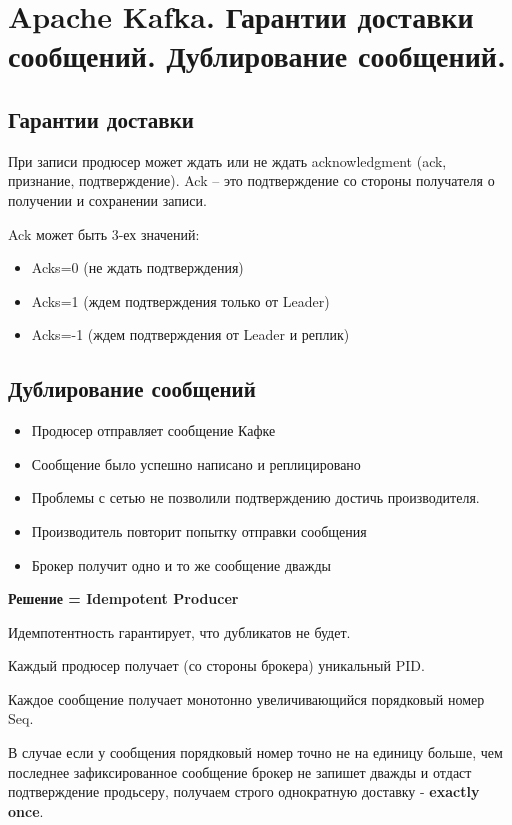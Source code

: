 \section{Apache Kafka. Гарантии доставки сообщений. Дублирование сообщений.}

\subsection*{Гарантии доставки}

При записи продюсер может ждать или не ждать 
acknowledgment (ack, признание, подтверждение).
Ack – это подтверждение со стороны получателя о получении и 
сохранении записи.

Ack может быть 3-ех значений:
\begin{itemize}
    \item Acks=0 (не ждать подтверждения)
    \item Acks=1 (ждем подтверждения только от Leader)
    \item Acks=-1 (ждем подтверждения от Leader и реплик)
\end{itemize}


\subsection*{Дублирование сообщений}

\begin{itemize}
    \item Продюсер отправляет сообщение Кафке
    \item Сообщение было успешно написано и реплицировано
    \item Проблемы с сетью не позволили подтверждению достичь производителя.
    \item Производитель повторит попытку отправки сообщения 
    \item Брокер получит одно и то же сообщение дважды
\end{itemize}

\textbf{Решение = Idempotent Producer}

Идемпотентность гарантирует, что дубликатов не будет.

Каждый продюсер получает (со стороны брокера) уникальный PID.

Каждое сообщение получает монотонно увеличивающийся порядковый номер Seq.

В случае если у сообщения порядковый номер точно не на единицу больше, чем 
последнее зафиксированное сообщение брокер не запишет дважды и отдаст 
подтверждение продьсеру, 
получаем строго однократную доставку - \textbf{exactly once}.

